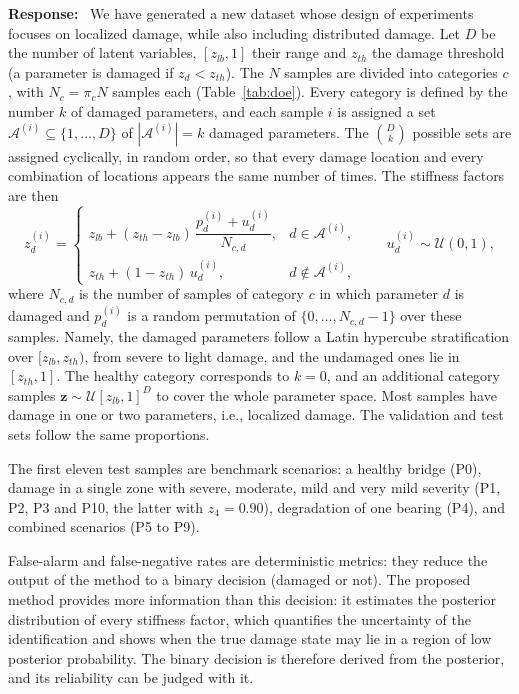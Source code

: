 \documentclass[11pt]{article}
\newenvironment{response}{\par\smallskip\noindent\color{resp}\textbf{Response:}\ }{\par}
\newcommand{\z}{\mathbf{z}}
\begin{document}
\begin{response}
We have generated a new dataset whose design of experiments focuses on localized damage, while also including
distributed damage. Let $D$ be the number of latent variables, $[z_{lb},1]$ their range and $z_{th}$ the damage threshold
(a parameter is damaged if $z_d<z_{th}$). The $N$ samples are divided into categories $c$, with $N_c=\pi_c N$ samples
each (Table~\ref{tab:doe}). Every category is defined by the number $k$ of damaged parameters, and each sample $i$ is
assigned a set $\mathcal{A}^{(i)}\subseteq\{1,\dots,D\}$ of $|\mathcal{A}^{(i)}|=k$ damaged parameters. The
$\binom{D}{k}$ possible sets are assigned cyclically, in random order, so that every damage location and every
combination of locations appears the same number of times. The stiffness factors are then
\begin{equation}
z_d^{(i)}=
\begin{cases}
z_{lb}+(z_{th}-z_{lb})\,\dfrac{p_d^{(i)}+u_d^{(i)}}{N_{c,d}}, & d\in\mathcal{A}^{(i)},\\[2ex]
z_{th}+(1-z_{th})\,u_d^{(i)}, & d\notin\mathcal{A}^{(i)},
\end{cases}
\qquad u_d^{(i)}\sim\mathcal{U}(0,1),
\label{eq:doe}
\end{equation}
where $N_{c,d}$ is the number of samples of category $c$ in which parameter $d$ is damaged and $p_d^{(i)}$ is a random
permutation of $\{0,\dots,N_{c,d}-1\}$ over these samples. Namely, the damaged parameters follow a Latin hypercube
stratification over $[z_{lb},z_{th})$, from severe to light damage, and the undamaged ones lie in $[z_{th},1]$. The
healthy category corresponds to $k=0$, and an additional category samples $\z\sim\mathcal{U}[z_{lb},1]^D$ to cover the
whole parameter space. Most samples have damage in one or two parameters, i.e., localized damage. The validation and
test sets follow the same proportions.

The first eleven test samples are benchmark scenarios: a healthy bridge (P0), damage in a single zone with severe,
moderate, mild and very mild severity (P1, P2, P3 and P10, the latter with $z_4=0.90$), degradation of one bearing (P4),
and combined scenarios (P5 to P9).

False-alarm and false-negative rates are deterministic metrics: they reduce the output of the method to a binary
decision (damaged or not). The proposed method provides more information than this decision: it estimates the posterior
distribution of every stiffness factor, which quantifies the uncertainty of the identification and shows when the true
damage state may lie in a region of low posterior probability. The binary decision is therefore derived from the
posterior, and its reliability can be judged with it.


\end{response}
\end{document}
